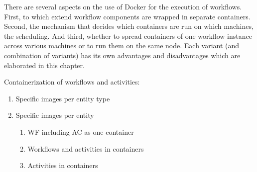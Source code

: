 
There are several aspects on the use of Docker for the execution of workflows. First, to which extend workflow components are wrapped in separate containers. Second, the mechanism that decides which containers are run on which machines, \ie the scheduling. And third, whether to spread containers of one workflow instance across various machines or to run them on the same node. Each variant (and combination of variants) has its own advantages and disadvantages which are elaborated in this chapter.

Containerization of workflows and activities:
\begin{enumerate}[nosep]
  \item Specific images per entity type
  \item Specific images per entity
    \begin{enumerate}[nosep]
      \item WF including AC as one container
      \item Workflows and activities in containers
      \item Activities in containers
    \end{enumerate}
\end{enumerate}

